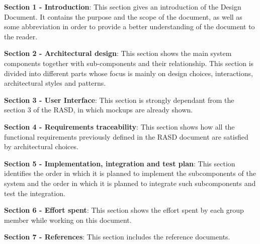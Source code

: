 \textbf{Section 1 - Introduction}: This section gives an introduction of the Design Document. It contains the purpose and the scope of the document, as well as some abbreviation in order to provide a better understanding of the document to the reader.\newline

\textbf{Section 2 - Architectural design}: This section shows the main system components together with sub-components and their relationship. This section is divided into different parts whose focus is mainly on design choices, interactions, architectural styles and patterns.\newline

\textbf{Section 3 - User Interface}: This section is strongly dependant from the section 3 of the RASD, in which mockups are already shown.\newline

\textbf{Section 4 - Requirements traceability}: This section shows how all the functional requirements previously defined in the RASD document are satisfied by architectural choices.\newline

\textbf{Section 5 - Implementation, integration and test plan}: This section identifies the order in which it is planned to implement the subcomponents of the system and the order in which it is planned to integrate such subcomponents and test the integration.\newline

\textbf{Section 6 - Effort spent}: This section shows the effort spent by each group member while working on this document.\newline

\textbf{Section 7 - References}: This section includes the reference documents.

%